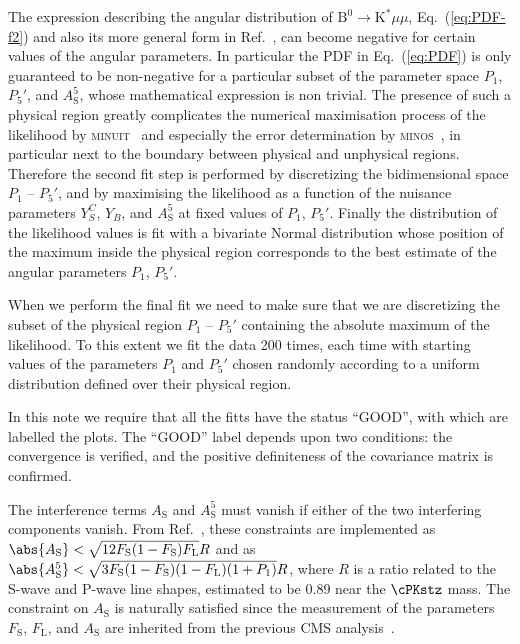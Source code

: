 The expression describing the angular distribution of $\mathrm{B}^0\to{\mathrm{K}^*\mu\mu}$, Eq.~(\ref{eq:PDF-f2}) and also its more
general form in Ref.~\cite{Descotes-Genon:2013vna}, can become negative for certain values of the angular parameters.
In particular the PDF in Eq.~(\ref{eq:PDF}) is only guaranteed to be non-negative for a particular subset of the parameter
space $P_1$, $P_5'$, and $A^5_\mathrm{S}$, whose mathematical expression is non trivial. The presence of such a physical
region greatly complicates the numerical maximisation process of the likelihood by \textsc{minuit}~\cite{Minuit}
and especially the error determination by \textsc{minos}~\cite{Minuit},
in particular next to the boundary between physical and unphysical regions.
Therefore the second fit step is performed by discretizing the bidimensional space $P_1$ -- $P_5'$, and by maximising the
likelihood as a function of the nuisance parameters $Y^{C}_{S}$, $Y_{B}$, and $A^5_\mathrm{S}$ at fixed values of $P_1$,
$P_5'$. Finally the distribution of the likelihood values is fit with a bivariate Normal distribution whose position
of the maximum inside the physical region corresponds to the best estimate of the angular parameters $P_1$, $P_5'$.

When we perform the final fit we need to make sure that we are discretizing the subset of the physical region
$P_1$ -- $P_5'$ containing the absolute maximum of the likelihood.
To this extent we fit the data 200 times, each time with starting values of the parameters $P_1$ and
$P_5'$ chosen randomly according to a uniform distribution defined over their physical region.

In this note we require that all the fitts have the status ``GOOD'', with which are labelled the plots.
The ``GOOD'' label depends upon two conditions: the convergence is verified, and the positive definiteness
of the covariance matrix is confirmed.

The interference terms $A_\mathrm{S}$ and $A^5_\mathrm{S}$ must vanish if either of the two interfering components
vanish. From Ref.~\cite{Descotes-Genon:2013vna}, these constraints are implemented as
$\abs{A_\mathrm{S}} < \sqrt{12 F_\mathrm{S}(1-F_\mathrm{S})F_\mathrm{L}}R$ and as
$\abs{A^5_\mathrm{S}} < \sqrt{3 F_\mathrm{S} (1-F_\mathrm{S}) (1-F_\mathrm{L}) (1+P_1)}R$, where $R$ is a ratio related
to the S-wave and P-wave line shapes, estimated to be 0.89 near the $\cPKstz$ mass.
The constraint on $A_\mathrm{S}$ is naturally satisfied since the measurement of the parameters $F_\mathrm{S}$,
$F_\mathrm{L}$, and $A_\mathrm{S}$ are inherited from the previous CMS analysis~\cite{CMS:2012}.

